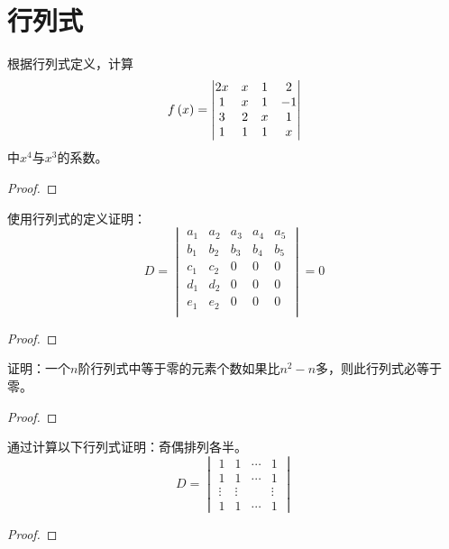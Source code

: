 \section{行列式}

\begin{problem}
根据行列式定义，计算
\begin{equation*}
    f\left( x \right)=
    \begin{vmatrix}
        2x & x & 1 & 2  \\
        1  & x & 1 & -1 \\
        3  & 2 & x & 1  \\
        1  & 1 & 1 & x
    \end{vmatrix}
\end{equation*}
中\(x^4\)与\(x^3\)的系数。
\end{problem}
\begin{proof}

\end{proof}

\begin{problem}
使用行列式的定义证明：
\begin{equation*}
    D=
    \begin{vmatrix}
        a_1 & a_2 & a_3 & a_4 & a_5 \\
        b_1 & b_2 & b_3 & b_4 & b_5 \\
        c_1 & c_2 & 0   & 0   & 0   \\
        d_1 & d_2 & 0   & 0   & 0   \\
        e_1 & e_2 & 0   & 0   & 0   \\
    \end{vmatrix}=0
\end{equation*}
\end{problem}
\begin{proof}

\end{proof}

\begin{problem}
证明：一个\(n\)阶行列式中等于零的元素个数如果比\(n^2-n\)多，则此行列式必等于零。
\end{problem}
\begin{proof}

\end{proof}

\begin{problem}
通过计算以下行列式证明：奇偶排列各半。
\begin{equation*}
    D=
    \begin{vmatrix}
        1      & 1      & \cdots & 1      \\
        1      & 1      & \cdots & 1      \\
        \vdots & \vdots &        & \vdots \\
        1      & 1      & \cdots & 1
    \end{vmatrix}
\end{equation*}
\end{problem}
\begin{proof}

\end{proof}

